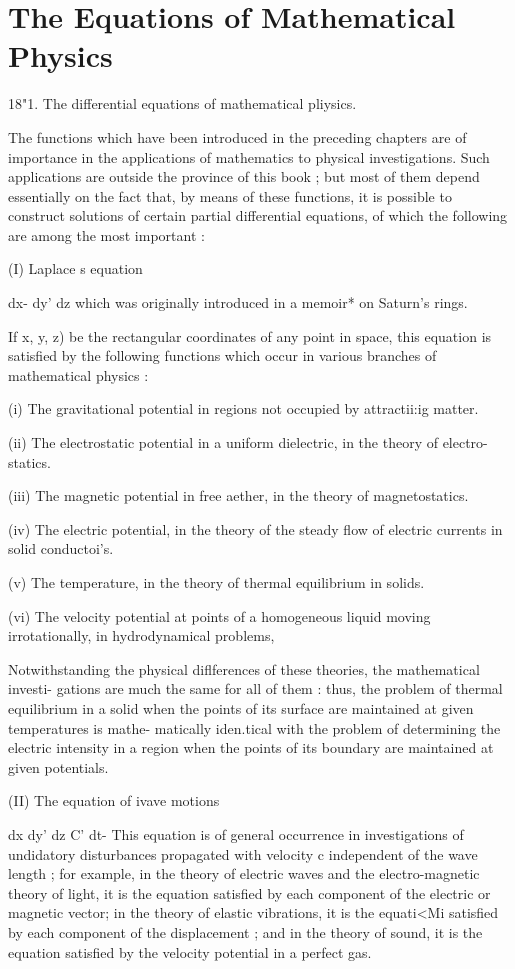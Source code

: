 \chapter{The Equations of Mathematical Physics} 

18"1. The differential equations of mathematical pliysics.

The functions which have been introduced in the preceding chapters are
of importance in the applications of mathematics to physical
investigations. Such applications are outside the province of this
book ; but most of them depend essentially on the fact that, by means
of these functions, it is possible to construct solutions of certain
partial differential equations, of which the following are among the
most important :

(I) Laplace s equation

dx- dy' dz which was originally introduced in a memoir* on Saturn's
rings.

If x, y, z) be the rectangular coordinates of any point in space, this
equation is satisfied by the following functions which occur in
various branches of mathematical physics :

(i) The gravitational potential in regions not occupied by
attractii:ig matter.

(ii) The electrostatic potential in a uniform dielectric, in the
theory of electro- statics.

(iii) The magnetic potential in free aether, in the theory of
magnetostatics.

(iv) The electric potential, in the theory of the steady flow of
electric currents in solid conductoi's.

(v) The temperature, in the theory of thermal equilibrium in solids.

(vi) The velocity potential at points of a homogeneous liquid moving
irrotationally, in hydrodynamical problems,

Notwithstanding the physical diflferences of these theories, the
mathematical investi- gations are much the same for all of them :
thus, the problem of thermal equilibrium in a solid when the points of
its surface are maintained at given temperatures is mathe- matically
iden.tical with the problem of determining the electric intensity in a
region when the points of its boundary are maintained at given
potentials.

(II) The equation of ivave motions

dx dy' dz C' dt- This equation is of general occurrence in
investigations of undidatory disturbances propagated with velocity c
independent of the wave length ; for example, in the theory of
electric waves and the electro-magnetic theory of light, it is the
equation satisfied by each component of the electric or magnetic
vector; in the theory of elastic vibrations, it is the equati<Mi
satisfied by each component of the displacement ; and in the theory of
sound, it is the equation satisfied by the velocity potential in a
perfect gas.

